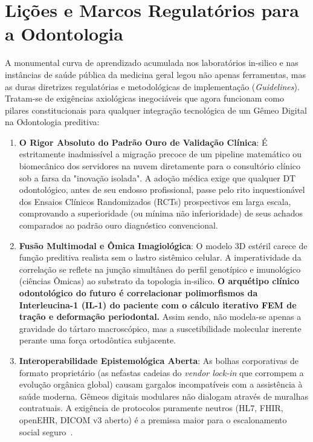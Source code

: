 \section{Lições e Marcos Regulatórios para a Odontologia}

A monumental curva de aprendizado acumulada nos laboratórios in-silico e nas instâncias de saúde pública da medicina geral legou não apenas ferramentas, mas as duras diretrizes regulatórias e metodológicas de implementação (\textit{Guidelines}). Tratam-se de exigências axiológicas inegociáveis que agora funcionam como pilares constitucionais para qualquer integração tecnológica de um Gêmeo Digital na Odontologia preditiva:

\begin{enumerate}
    \item \textbf{O Rigor Absoluto do Padrão Ouro de Validação Clínica}: É estritamente inadmissível a migração precoce de um pipeline matemático ou biomecânico dos servidores na nuvem diretamente para o consultório clínico sob a farsa da "inovação isolada". A adoção médica exige que qualquer DT odontológico, antes de seu endosso profissional, passe pelo rito inquestionável dos Ensaios Clínicos Randomizados (RCTs) prospectivos em larga escala, comprovando a superioridade (ou mínima não inferioridade) de seus achados comparados ao padrão ouro diagnóstico convencional.
    \item \textbf{Fusão Multimodal e Ômica Imagiológica}: O modelo 3D estéril carece de função preditiva realista sem o lastro sistêmico celular. A imperatividade da correlação se reflete na junção simultânea do perfil genotípico e imunológico (ciências Ômicas) ao substrato da topologia in-silico. \textbf{O arquétipo clínico odontológico do futuro é correlacionar polimorfismos da Interleucina-1 (IL-1) do paciente com o cálculo iterativo FEM de tração e deformação periodontal.} Assim sendo, não modela-se apenas a gravidade do tártaro macroscópico, mas a suscetibilidade molecular inerente perante uma força ortodôntica subjacente.
    \item \textbf{Interoperabilidade Epistemológica Aberta}: As bolhas corporativas de formato proprietário (as nefastas cadeias do \textit{vendor lock-in} que corrompem a evolução orgânica global) causam gargalos incompatíveis com a assistência à saúde moderna. Gêmeos digitais modulares não dialogam através de muralhas contratuais. A exigência de protocolos puramente neutros (HL7, FHIR, openEHR, DICOM v3 aberto) é a premissa maior para o escalonamento social seguro~\cite{robles2023opentwins}.

\end{enumerate}

